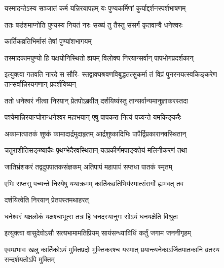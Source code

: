 \twolineshloka
{यस्मादन्तेऽस्य सञ्जातं कर्म यन्निरयापहम्}
{यः पुण्यकर्मिणां कुर्याद्दर्शनस्पर्शभाषणम्} %

\twolineshloka
{ततः षडंशमाप्नोति पुण्यस्य नियतं नरः}
{सख्यं तु तैस्तु संसर्गं कृतवान्वै धनेश्वरः} %


\onelineshloka
{कार्तिकव्रतिभिर्मासं तेषां पुण्यांशभागयम्} %

\twolineshloka
{तस्मादकामपुण्यो हि यक्षयोनिस्थितो ह्ययम्}
{विलोक्य निरयान्सर्वान् पापभोगप्रदर्शकान्} %


\fourlineindentedshloka
{इत्युक्त्वा गतवति नारदे स सौरि-}
{स्तद्वाक्यश्रवणविबुद्धतत्सुकर्मा}
{तं विप्रं पुनरनयत्स्वकिङ्करेण}
{तान्सर्वान्निरयगणान् प्रदर्शयिष्यन्} %


\twolineshloka
{ततो धनेश्वरं नीत्वा निरयान् प्रेतपोऽब्रवीत्}
{दर्शयिष्यंस्तु तान्सर्वान्यमानुज्ञाकरस्तदा} %


\twolineshloka
{पश्येमान्निरयान्घोरान्धनेश्वर महाभयान्}
{एषु पापकरा नित्यं पच्यन्ते यमकिङ्करैः} %

\twolineshloka
{अकामात्पातकं शुष्कं कामादार्द्रमुदाहृतम्}
{आर्द्रशुष्कादिभिः पापैर्द्विप्रकारानवस्थितान्} %

\twolineshloka
{चतुराशीतिसङ्ख्याकैः पृथग्भेदैरवस्थितान्}
{यत्प्रकीर्णमपाङ्क्तेयं मलिनीकरणं तथा} %

\twolineshloka
{जातिभ्रंशकरं तद्वदुपपातकसंज्ञकम्}
{अतिपापं महापापं सप्तधा पातकं स्मृतम्} %

\twolineshloka
{एभिः सप्तसु पच्यन्ते निरयेषु यथाक्रमम्}
{कार्तिकव्रतिभिर्यस्मात्संसर्गो ह्यभवत् तव} %




\onelineshloka
{दर्शयित्वेति निरयान् प्रेतपस्तमथाहरत्} %

\twolineshloka
{धनेश्वरं यक्षलोकं यक्षश्चाभूत्स तत्र हि}
{धनदस्यानुगः सोऽयं धनयक्षेति विश्रुतः} %


\twolineshloka
{इत्युक्त्वा वासुदेवोऽसौ सत्यभामामतिप्रियम्}
{सायंसन्ध्याविधिं कर्तुं जगाम जननीगृहम्} %


\twolineshloka
{एवम्प्रभावः खलु कार्तिकोऽयं मुक्तिप्रदो भुक्तिकरश्च यस्मात्}
{प्रयान्त्यनेकाऽर्जितपातकानि व्रतस्य सन्दर्शयतोऽपि मुक्तिम्} %





